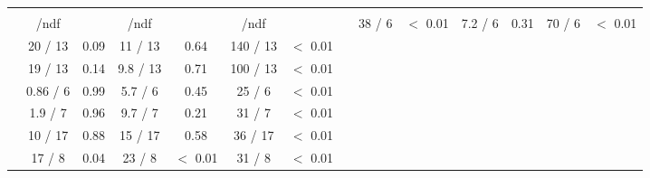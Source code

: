 \begin{table}
{\begin{tabular}{ccccccc}
		&	  & 	  & 	 \multicolumn{2}{c}{\mgamcMLMpythia} \\ 
		\vspace*{0.02cm} &	\chis/ndf & \pvalue &	\chis/ndf & \pvalue &	\chis/ndf & \pvalue &			\hline
		\vspace*{0.02cm} \NJET &	38 / 6 &	 $<$ 0.01 &	7.2 / 6 &	 0.31 &	70 / 6 &	 $<$ 0.01 \\
		\vspace*{0.02cm} \HT &	20 / 13 &	 0.09 &	11 / 13 &	 0.64 &	140 / 13 &	 $<$ 0.01 \\
		\vspace*{0.02cm} \ST &	19 / 13 &	 0.14 &	9.8 / 13 &	 0.71 &	100 / 13 &	 $<$ 0.01 \\
		\vspace*{0.02cm} \ptmiss &	0.86 / 6 &	 0.99 &	5.7 / 6 &	 0.45 &	25 / 6 &	 $<$ 0.01 \\
		\vspace*{0.02cm} \WPT &	1.9 / 7 &	 0.96 &	9.7 / 7 &	 0.21 &	31 / 7 &	 $<$ 0.01 \\
		\vspace*{0.02cm} \LPT &	10 / 17 &	 0.88 &	15 / 17 &	 0.58 &	36 / 17 &	 $<$ 0.01 \\
		\vspace*{0.02cm} \LETA &	17 / 8 &	 0.04 &	23 / 8 &	 $<$ 0.01 &	31 / 8 &	 $<$ 0.01 \\
	\end{tabular}%
	}
\end{table}
